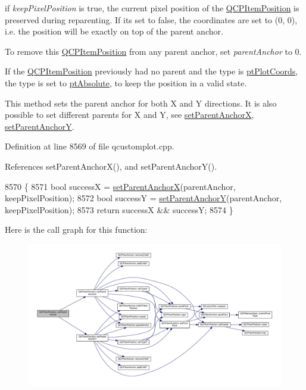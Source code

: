 if {\itshape keep\+Pixel\+Position} is true, the current pixel position of the \hyperlink{class_q_c_p_item_position}{Q\+C\+P\+Item\+Position} is preserved during reparenting. If it\textquotesingle{}s set to false, the coordinates are set to (0, 0), i.\+e. the position will be exactly on top of the parent anchor.

To remove this \hyperlink{class_q_c_p_item_position}{Q\+C\+P\+Item\+Position} from any parent anchor, set {\itshape parent\+Anchor} to 0.

If the \hyperlink{class_q_c_p_item_position}{Q\+C\+P\+Item\+Position} previously had no parent and the type is \hyperlink{class_q_c_p_item_position_aad9936c22bf43e3d358552f6e86dbdc8ad5ffb8dc99ad73263f7010c77342294c}{pt\+Plot\+Coords}, the type is set to \hyperlink{class_q_c_p_item_position_aad9936c22bf43e3d358552f6e86dbdc8a564f5e53e550ead1ec5fc7fc7d0b73e0}{pt\+Absolute}, to keep the position in a valid state.

This method sets the parent anchor for both X and Y directions. It is also possible to set different parents for X and Y, see \hyperlink{class_q_c_p_item_position_add71461a973927c74e42179480916d9c}{set\+Parent\+Anchor\+X}, \hyperlink{class_q_c_p_item_position_add5ec1db9d19cec58a3b5c9e0a0c3f9d}{set\+Parent\+Anchor\+Y}. 

Definition at line 8569 of file qcustomplot.\+cpp.



References set\+Parent\+Anchor\+X(), and set\+Parent\+Anchor\+Y().


\begin{DoxyCode}
8570                                                               \{
8571   \textcolor{keywordtype}{bool} successX = \hyperlink{class_q_c_p_item_position_add71461a973927c74e42179480916d9c}{setParentAnchorX}(parentAnchor, keepPixelPosition);
8572   \textcolor{keywordtype}{bool} successY = \hyperlink{class_q_c_p_item_position_add5ec1db9d19cec58a3b5c9e0a0c3f9d}{setParentAnchorY}(parentAnchor, keepPixelPosition);
8573   \textcolor{keywordflow}{return} successX && successY;
8574 \}
\end{DoxyCode}


Here is the call graph for this function\+:\nopagebreak
\begin{figure}[H]
\begin{center}
\leavevmode
\includegraphics[width=350pt]{class_q_c_p_item_position_ac094d67a95d2dceafa0d50b9db3a7e51_cgraph}
\end{center}
\end{figure}


